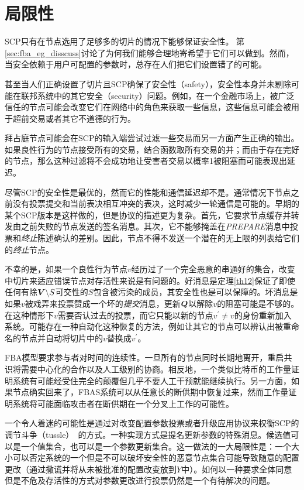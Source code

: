 \section{局限性}\label{sec:limit}

SCP只有在节点选用了足够多的{\quorum}切片的情况下能够保证安全性。	第\ref{sec:fba_eg_disscuss}讨论了为何我们能够合理地寄希望于它们可以做到。然而，当安全依赖于用户可配置的参数时，总存在人们把它们设置错了的可能。

甚至当人们正确设置了{\quorum}切片且SCP确保了安全性（safety），安全性本身并未剔除可能在联邦系统中的其它安全（security）问题。例如，在一个金融市场上，被广泛信任的节点可能会改变它们在网络中的角色来获取一些信息，这些信息可能会被用于超前交易或者其它不道德的行为。

拜占庭节点可能会在SCP的输入端尝试过滤一些交易而另一方面产生正确的输出。如果良性行为的节点接受所有的交易，结合函数取所有交易的并；而由于存在完好的节点，那么这种过滤将不会成功地让受害者交易以概率1被阻塞而可能表现出延迟。

尽管SCP的安全性是最优的，然而它的性能和通信延迟却不是。通常情况下节点之前没有投票提交和当前表决相互冲突的表决，这时减少一轮通信是可能的。早期的某个SCP版本是这样做的，但是协议的描述更为复杂。首先，它要求节点缓存并转发由之前失败的节点发送的签名消息。其次，它不能够掩盖在\textsl{PREPARE}消息中投票和\textit{终止}陈述确认的差别。因此，节点不得不发送一个潜在的无上限的列表给它们的\textit{终止}节点。

不幸的是，如果一个良性行为节点$v$经历过了一个完全恶意的串通好的{\vblock}集合，改变{\slot}中切片来适应错误节点对存活性来说是有问题的。好消息是定理\ref{th12}保证了即使任何有除${\bm V}\backslash S${\quorum}可交性的$S$包含被污染的成员，其安全性也是可以保障的。坏消息是如果$v$被戏弄来投票赞成一个坏的\textit{提交}消息，更新${\bm Q}$以解除$v$的阻塞可能是不够的。在这种情形下$v$需要否认过去的投票，而它只能以新的节点$v^{\prime}\neq v$的身份重新加入系统。可能存在一种自动化这种恢复的方法，例如让其它的节点可以辨认出被重命名的节点并自动将切片中的$v$替换成$v^{\prime}$。

FBA模型要求参与者对时间的连续性。一旦所有的节点同时长期地离开，重启共识将需要中心化的合作以及人工级别的协商。相反地，一个类似比特币的工作量证明系统有可能经受住完全的颠覆但几乎不要人工干预就能继续执行。另一方面，如果节点确实回来了，FBAS系统可以从任意长的断供期中恢复过来，然而工作量证明系统将可能面临攻击者在断供期在一个分叉上工作的可能性。

一个令人着迷的可能性是通过对改变配置参数投票或者升级应用协议来权衡SCP的调节斗争（tussle）~\cite{Clark:2005:TCD:1074047.1074049}的方式。一种实现方式是提名更新参数的特殊消息。候选值可以是一个值集合，也可以是一个参数更新集合。这一做法的一大局限性是：一个大小可以否定系统的一个{\quorum}但是不可以破坏安全性的恶意节点集合可能导致随意的配置更改（通过撒谎并将从未被批准的配置改变放到$Y$中）。如何以一种要求全体{\quorum}同意但是不危及存活性的方式对参数更改进行投票仍然是一个有待解决的问题。